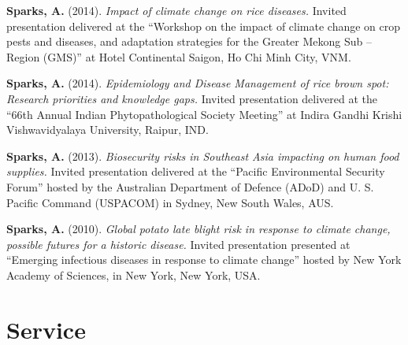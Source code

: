 \documentclass[11pt, a4paper]{awesome-cv}
\begin{document}
\textbf{Sparks, A.} (2014). \emph{Impact of climate change on rice diseases.} Invited presentation delivered at the ``Workshop on the impact of climate change on crop pests and diseases, and adaptation strategies for the Greater Mekong Sub -- Region (GMS)'' at Hotel Continental Saigon, Ho Chi Minh City, VNM.

\textbf{Sparks, A.} (2014). \emph{Epidemiology and Disease Management of rice brown spot: Research priorities and knowledge gaps.} Invited presentation delivered at the ``66th Annual Indian Phytopathological Society Meeting'' at Indira Gandhi Krishi Vishwavidyalaya University, Raipur, IND.

\textbf{Sparks, A.} (2013). \emph{Biosecurity risks in Southeast Asia impacting on human food supplies.} Invited presentation delivered at the ``Pacific Environmental Security Forum'' hosted by the Australian Department of Defence (ADoD) and U. S. Pacific Command (USPACOM) in Sydney, New South Wales, AUS.

\textbf{Sparks, A.} (2010). \emph{Global potato late blight risk in response to climate change, possible futures for a historic disease.} Invited presentation presented at ``Emerging infectious diseases in response to climate change'' hosted by New York Academy of Sciences, in New York, New York, USA.

\endgroup

\hypertarget{service}{%
\section{Service}\label{service}}
\end{document}
